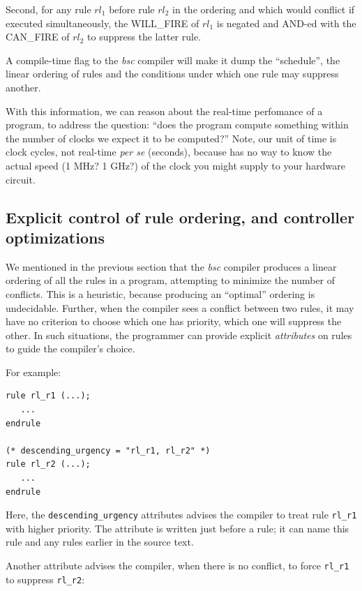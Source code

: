 Second, for any rule $rl_1$ before rule $rl_2$ in the ordering and
which would conflict if executed simultaneously, the WILL\_FIRE of
$rl_1$ is negated and AND-ed with the CAN\_FIRE of $rl_2$ to suppress
the latter rule.

A compile-time flag to the \emph{bsc} compiler will make it dump the
``schedule'', {\ie} the linear ordering of rules and the conditions
under which one rule may suppress another.

With this information, we can reason about the real-time perfomance of
a {\BSV} program, {\ie} to address the question: ``does the program
compute something within the number of clocks we expect it to be
computed?''  Note, our unit of time is clock cycles, not real-time
\emph{per se} (seconds), because {\BSV} has no way to know the actual
speed (1 MHz?  1 GHz?) of the clock you might supply to your hardware
circuit.


\subsection{Explicit control of rule ordering, and controller optimizations}

We mentioned in the previous section that the \emph{bsc} compiler
produces a linear ordering of all the rules in a program, attempting
to minimize the number of conflicts.  This is a heuristic, because
producing an ``optimal'' ordering is undecidable.  Further, when the
compiler sees a conflict between two rules, it may have no criterion
to choose which one has priority, {\ie} which one will suppress the
other.  In such situations, the {\BSV} programmer can provide explicit
\emph{attributes} on rules to guide the compiler's choice.

For example:

{\footnotesize
\begin{Verbatim}[frame=single,label=BSV]
rule rl_r1 (...);
   ...
endrule

(* descending_urgency = "rl_r1, rl_r2" *)
rule rl_r2 (...);
   ...
endrule
\end{Verbatim}
}

Here, the \verb|descending_urgency| attributes advises the compiler to
treat rule \verb|rl_r1| with higher priority.  The attribute is
written just before a rule; it can name this rule and any rules
earlier in the source text.

Another attribute advises the compiler, when there is no conflict, to
force \verb|rl_r1| to suppress \verb|rl_r2|:

